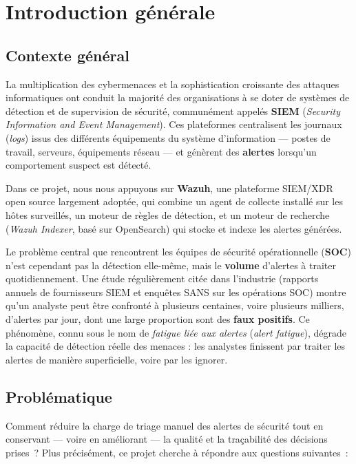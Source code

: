 \chapter{Introduction générale}
\label{chap:introduction}

\section{Contexte général}

La multiplication des cybermenaces et la sophistication croissante des
attaques informatiques ont conduit la majorité des organisations à se doter
de systèmes de détection et de supervision de sécurité, communément appelés
\textbf{SIEM} (\textit{Security Information and Event Management}). Ces
plateformes centralisent les journaux (\textit{logs}) issus des différents
équipements du système d'information — postes de travail, serveurs,
équipements réseau — et génèrent des \textbf{alertes} lorsqu'un comportement
suspect est détecté.

Dans ce projet, nous nous appuyons sur \textbf{Wazuh}, une plateforme SIEM/XDR
open source largement adoptée, qui combine un agent de collecte installé sur
les hôtes surveillés, un moteur de règles de détection, et un moteur de
recherche (\textit{Wazuh Indexer}, basé sur OpenSearch) qui stocke et indexe
les alertes générées.

Le problème central que rencontrent les équipes de sécurité opérationnelle
(\textbf{SOC}) n'est cependant pas la détection elle-même, mais le
\textbf{volume} d'alertes à traiter quotidiennement. Une étude régulièrement
citée dans l'industrie (rapports annuels de fournisseurs SIEM et enquêtes
SANS sur les opérations SOC) montre qu'un analyste peut être confronté à
plusieurs centaines, voire plusieurs milliers, d'alertes par jour, dont une
large proportion sont des \textbf{faux positifs}. Ce phénomène, connu sous le
nom de \textit{fatigue liée aux alertes} (\textit{alert fatigue}), dégrade la
capacité de détection réelle des menaces : les analystes finissent par
traiter les alertes de manière superficielle, voire par les ignorer.

\section{Problématique}

Comment réduire la charge de triage manuel des alertes de sécurité tout en
conservant — voire en améliorant — la qualité et la traçabilité des
décisions prises~? Plus précisément, ce projet cherche à répondre aux
questions suivantes~:

